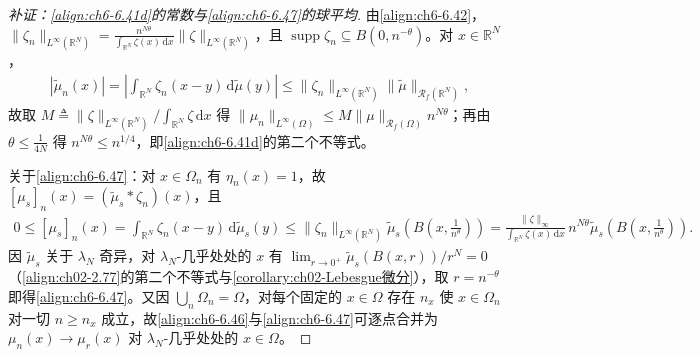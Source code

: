 \documentclass[../../main.tex]{subfiles}%
\begin{document}
\begin{proof}[补证：\eqref{align:ch6-6.41d}的常数与\eqref{align:ch6-6.47}的球平均]
由\eqref{align:ch6-6.42}，$\|\zeta_n\|_{L^\infty(\mathbb{R}^N)}=\frac{n^{N\theta}}{\int_{\mathbb{R}^N}\zeta(x)\,\mathrm{d}x}\|\zeta\|_{L^\infty(\mathbb{R}^N)}$，且 $\operatorname{supp}\zeta_n\subseteq B(0,n^{-\theta})$。对 $x\in\mathbb{R}^N$，
\begin{align*}
|\widetilde\mu_n(x)|=\left|\int_{\mathbb{R}^N}\zeta_n(x-y)\,\mathrm{d}\widetilde\mu(y)\right|
\leqslant\|\zeta_n\|_{L^\infty(\mathbb{R}^N)}\|\widetilde\mu\|_{\mathscr{R}_f(\mathbb{R}^N)},
\end{align*}
故取 $M\triangleq\|\zeta\|_{L^\infty(\mathbb{R}^N)}/\int_{\mathbb{R}^N}\zeta\,\mathrm{d}x$ 得 $\|\mu_n\|_{L^\infty(\Omega)}\leqslant M\|\mu\|_{\mathscr{R}_f(\Omega)}n^{N\theta}$；再由 $\theta\leqslant\frac{1}{4N}$ 得 $n^{N\theta}\leqslant n^{1/4}$，即\eqref{align:ch6-6.41d}的第二个不等式。

关于\eqref{align:ch6-6.47}：对 $x\in\Omega_n$ 有 $\eta_n(x)=1$，故 $[\mu_s]_n(x)=(\widetilde\mu_s*\zeta_n)(x)$，且
\begin{align*}
0\leqslant[\mu_s]_n(x)=\int_{\mathbb{R}^N}\zeta_n(x-y)\,\mathrm{d}\widetilde\mu_s(y)
\leqslant\|\zeta_n\|_{L^\infty(\mathbb{R}^N)}\widetilde\mu_s\left(B\left(x,\frac{1}{n^\theta}\right)\right)
=\frac{\|\zeta\|_\infty}{\int_{\mathbb{R}^N}\zeta(x)\,\mathrm{d}x}\,n^{N\theta}\widetilde\mu_s\left(B\left(x,\frac{1}{n^\theta}\right)\right).
\end{align*}
因 $\widetilde\mu_s$ 关于 $\lambda_N$ 奇异，对 $\lambda_N$-几乎处处的 $x$ 有 $\lim_{r\to0^+}\widetilde\mu_s(B(x,r))/r^N=0$（\eqref{align:ch02-2.77}的第二个不等式与\cref{corollary:ch02-Lebesgue微分}），取 $r=n^{-\theta}$ 即得\eqref{align:ch6-6.47}。又因 $\bigcup_n\Omega_n=\Omega$，对每个固定的 $x\in\Omega$ 存在 $n_x$ 使 $x\in\Omega_n$ 对一切 $n\geqslant n_x$ 成立，故\eqref{align:ch6-6.46}与\eqref{align:ch6-6.47}可逐点合并为 $\mu_n(x)\to\mu_r(x)$ 对 $\lambda_N$-几乎处处的 $x\in\Omega$。
\end{proof}
\end{document}
